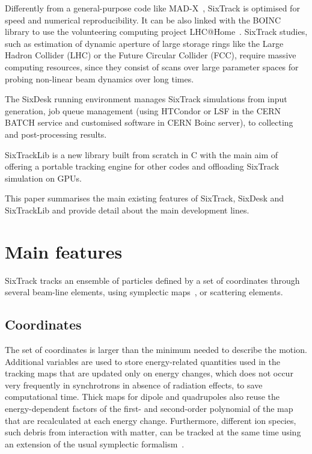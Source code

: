 \documentclass[a4paper,
              ]{jacow}
\begin{document}
Differently from a general-purpose code like MAD-X~\cite{madx, madxICAP18}, SixTrack is optimised for speed and numerical reproducibility. It can be also linked with the BOINC library to use the volunteering computing project LHC@Home~\cite{lhcathome}.
SixTrack studies, such as estimation of dynamic aperture of large storage rings like the Large Hadron Collider (LHC) or the Future Circular Collider (FCC), require massive computing resources, since they consist of scans over large parameter spaces for probing non-linear beam dynamics over long times.

The SixDesk running environment manages SixTrack simulations from input generation, job queue management (using HTCondor or LSF in the CERN BATCH service and customised software in CERN Boinc server), to collecting and post-processing results.  

SixTrackLib is a new library built from scratch in C with the main aim of offering a portable tracking engine for other codes and offloading SixTrack simulation on GPUs.

This paper summarises the main existing features of SixTrack, SixDesk and SixTrackLib and provide detail about the main development lines.

\section{Main features}

SixTrack tracks an ensemble of particles defined by a set of coordinates through several beam-line elements, using symplectic maps~\cite{ripken95, heinemann95, barber87}, or scattering elements.

\subsection{Coordinates}
The set of coordinates is larger than the minimum needed to describe the motion. Additional variables are used to store energy-related quantities used in the tracking maps that are updated only on energy changes, which does not occur very frequently in synchrotrons in absence of radiation effects, to save computational time. Thick maps for dipole and quadrupoles also reuse the energy-dependent factors of the first- and second-order polynomial of the map that are recalculated at each energy change. Furthermore, different ion species, such debris from interaction with matter, can be tracked at the same time using an extension of the usual symplectic formalism~\cite{ions}.
\end{document}
